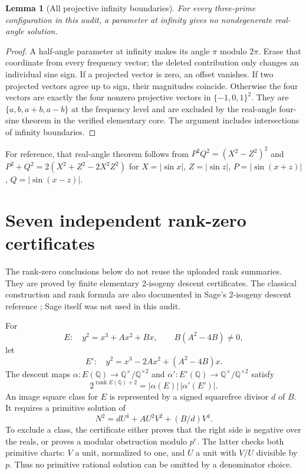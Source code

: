 \documentclass[11pt]{article}
\newtheorem{lemma}[theorem]{Lemma}
\theoremstyle{remark}\newtheorem{remark}[theorem]{Remark}
\newcommand{\Q}{\mathbb Q}\newcommand{\Z}{\mathbb Z}
\begin{document}
\begin{lemma}[All projective infinity boundaries]\label{lem:infinity}
For every three-prime configuration in this audit, a parameter at infinity gives no nondegenerate real-angle solution.
\end{lemma}
\begin{proof}
A half-angle parameter at infinity makes its angle $\pi$ modulo $2\pi$. Erase that coordinate from every frequency vector; the deleted contribution only changes an individual sine sign. If a projected vector is zero, an offset vanishes. If two projected vectors agree up to sign, their magnitudes coincide. Otherwise the four vectors are exactly the four nonzero projective vectors in $\{-1,0,1\}^2$. They are $\{a,b,a+b,a-b\}$ at the frequency level and are excluded by the real-angle four-sine theorem in the verified elementary core. The argument includes intersections of infinity boundaries.
\end{proof}
For reference, that real-angle theorem follows from $P^2Q^2=(X^2-Z^2)^2$ and $P^2+Q^2=2(X^2+Z^2-2X^2Z^2)$ for $X=|\sin x|$, $Z=|\sin z|$, $P=|\sin(x+z)|$, $Q=|\sin(x-z)|$.

\section{Seven independent rank-zero certificates}\label{sec:rank}
The rank-zero conclusions below do not reuse the uploaded rank summaries. They are proved by finite elementary 2-isogeny descent certificates. The classical construction and rank formula are also documented in Sage's 2-isogeny descent reference \cite{SageDescent}; Sage itself was not used in this audit.

For
\[
E:\quad y^2=x^3+Ax^2+Bx,\qquad B(A^2-4B)\ne0,
\]
let
\[
E':\quad y^2=x^3-2Ax^2+(A^2-4B)x.
\]
The descent maps $\alpha:E(\Q)\to\Q^\times/\Q^{\times2}$ and $\alpha':E'(\Q)\to\Q^\times/\Q^{\times2}$ satisfy
\begin{equation}\label{eq:rank}
2^{\operatorname{rank}E(\Q)+2}=|\alpha(E)|\,|\alpha'(E')|.
\end{equation}
An image square class for $E$ is represented by a signed squarefree divisor $d$ of $B$. It requires a primitive solution of
\begin{equation}\label{eq:quarticdescent}
N^2=dU^4+A U^2V^2+(B/d)V^4.
\end{equation}
To exclude a class, the certificate either proves that the right side is negative over the reals, or proves a modular obstruction modulo $p^e$. The latter checks both primitive charts: $V$ a unit, normalized to one, and $U$ a unit with $V/U$ divisible by $p$. Thus no primitive rational solution can be omitted by a denominator choice.
\end{document}
